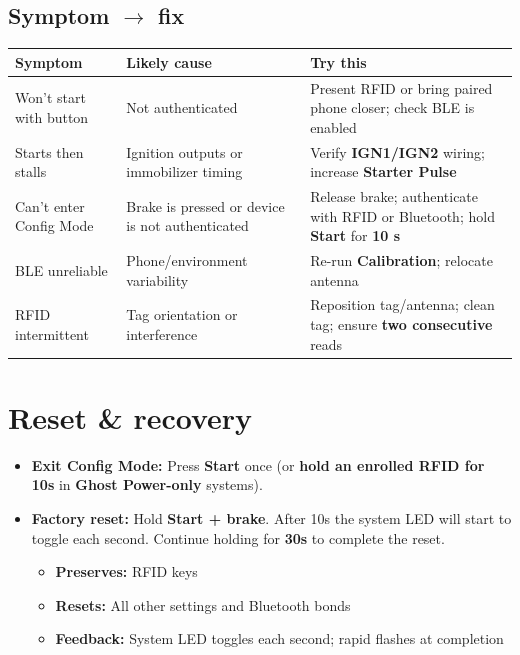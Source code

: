 \documentclass[11pt]{article}
\newcommand{\gkto}{\texorpdfstring{$\rightarrow$}{->}}
\begin{document}
\subsection{Symptom \gkto{} fix}
\begin{tabularx}{\linewidth}{@{}lYY@{}}
\toprule
\textbf{Symptom} & \textbf{Likely cause} & \textbf{Try this}\\
\midrule
Won’t start with button & Not authenticated & Present RFID or bring paired phone closer; check BLE is enabled \\
Starts then stalls & Ignition outputs or immobilizer timing & Verify \textbf{IGN1/IGN2} wiring; increase \textbf{Starter Pulse} \\
Can’t enter Config Mode & Brake is pressed or device is not authenticated & Release brake; authenticate with RFID or Bluetooth; hold \textbf{Start} for \textbf{10 s} \\
BLE unreliable & Phone/environment variability & Re-run \textbf{Calibration}; relocate antenna \\
RFID intermittent & Tag orientation or interference & Reposition tag/antenna; clean tag; ensure \textbf{two consecutive} reads \\
\bottomrule
\end{tabularx}

\section{Reset \& recovery}
\begin{itemize}
  \item \textbf{Exit Config Mode:} Press \textbf{Start} once (or \textbf{hold an enrolled RFID for 10s} in \textbf{Ghost Power-only} systems).
  \item \textbf{Factory reset:} Hold \textbf{Start + brake}. After 10s the system LED will start to toggle each second. Continue holding for \textbf{30s} to complete the reset.
  \begin{itemize}
    \item \textbf{Preserves:} RFID keys
    \item \textbf{Resets:} All other settings and Bluetooth bonds
    \item \textbf{Feedback:} System LED toggles each second; rapid flashes at completion
  \end{itemize}
\end{itemize}
\end{document}
